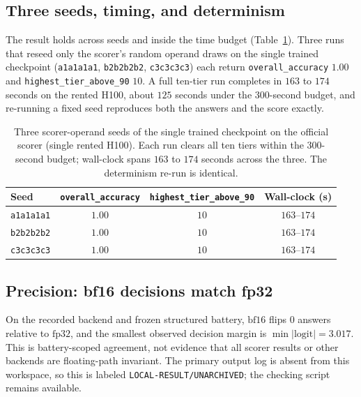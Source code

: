 \documentclass[11pt]{article}
\begin{document}
\subsection{Three seeds, timing, and determinism}
\label{sec:results:seeds}

The result holds across seeds and inside the time budget (Table~\ref{tab:seeds}).
Three runs that reseed only the scorer's random operand draws on the single trained
checkpoint (\texttt{a1a1a1a1}, \texttt{b2b2b2b2}, \texttt{c3c3c3c3}) each return \texttt{overall\_accuracy} $1.00$ and
\texttt{highest\_tier\_above\_90} $10$. A full ten-tier run completes in $163$ to
$174$ seconds on the rented H100, about $125$ seconds under the $300$-second budget, and
re-running a fixed seed reproduces both the answers and the score exactly.

\begin{table}[t]
 \centering
 \small
 \begin{tabular}{lccc}
 \toprule
 Seed & \texttt{overall\_accuracy} & \texttt{highest\_tier\_above\_90} & Wall-clock (s) \\
 \midrule
 \texttt{a1a1a1a1} & $1.00$ & $10$ & $163$--$174$ \\
 \texttt{b2b2b2b2} & $1.00$ & $10$ & $163$--$174$ \\
 \texttt{c3c3c3c3} & $1.00$ & $10$ & $163$--$174$ \\
 \bottomrule
 \end{tabular}
 \caption{Three scorer-operand seeds of the single trained checkpoint on the official scorer (single rented H100). Each run
 clears all ten tiers within the $300$-second budget; wall-clock spans $163$ to
 $174$ seconds across the three. The determinism re-run is identical.}
 \label{tab:seeds}
\end{table}

\subsection{Precision: bf16 decisions match fp32}
\label{sec:results:bf16}

On the recorded backend and frozen structured battery, $\mathrm{bf16}$ flips $0$
answers relative to $\mathrm{fp32}$, and the smallest observed decision margin is
$\min |\text{logit}| = 3.017$. This is battery-scoped agreement, not evidence that
all scorer results or other backends are floating-path invariant. The primary
output log is absent from this workspace, so this is labeled
\texttt{LOCAL-RESULT/UNARCHIVED}; the checking script remains available.
\end{document}
